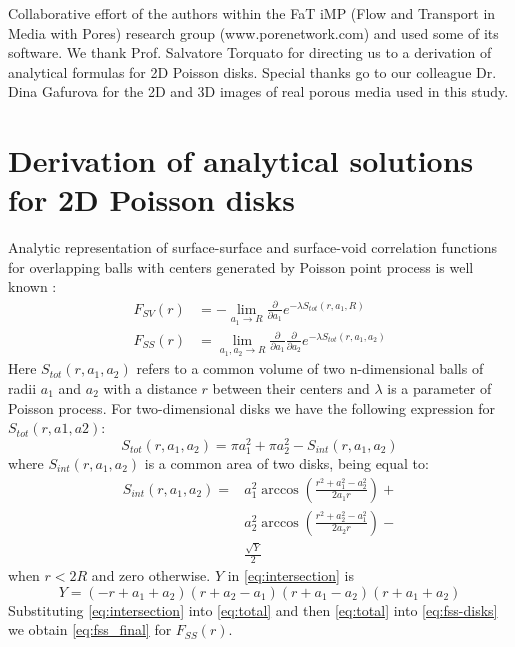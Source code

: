 \documentclass[reprint,amsmath,amssymb,aps,pre,showkeys,showpacs]{revtex4-1}
\begin{document}
Collaborative effort of the authors within the FaT iMP (Flow and Transport in
Media with Pores) research group (www.porenetwork.com) and used some of its
software. We thank Prof. Salvatore Torquato for directing us to a
derivation of analytical formulas for 2D Poisson disks. Special thanks go to
our colleague Dr. Dina Gafurova for the 2D and 3D images of real porous media
used in this study.

\appendix
\section{Derivation of analytical solutions for 2D Poisson disks}
\label{ap:overlapping-disks}
Analytic representation of surface-surface and surface-void correlation
functions for overlapping balls with centers generated by Poisson point process
is well known \cite{Torquato_book}:
\begin{align}
  F_{SV}(r) &= -\lim_{a_1 \rightarrow R} \frac{\partial}{\partial a_1}
  e^{-\lambda S_{tot}(r, a_1, R)} \label{eq:fsv-disks} \\
  F_{SS}(r) &= \lim_{a_1, a_2 \rightarrow R} \frac{\partial}{\partial a_1}
  \frac{\partial}{\partial a_2} e^{-\lambda S_{tot}(r, a_1,
    a_2)} \label{eq:fss-disks}
\end{align}
Here $S_{tot}(r, a_1, a_2)$ refers to a common volume of two n-dimensional balls
of radii $a_1$ and $a_2$ with a distance $r$ between their centers and $\lambda$
is a parameter of Poisson process. For two-dimensional disks we have the
following expression for $S_{tot}(r, a1, a2)$:
\begin{equation}
  S_{tot}(r, a_1, a_2) = \pi a_1^2 + \pi a_2^2 - S_{int}(r, a_1, a_2) \label{eq:total}
\end{equation}
where $S_{int}(r, a_1, a_2)$ is a common area of two disks, being equal to:
\begin{align}
  S_{int}(r, a_1, a_2) =&  a_1^2 \arccos(\frac{r^2+a_1^2-a_2^2}{2a_1r}) + \\
  & a_2^2 \arccos(\frac{r^2+a_2^2-a_1^2}{2a_2r}) - \\
  & \frac{\sqrt{Y}}{2} \label{eq:intersection}
\end{align}
when $r<2R$ and zero otherwise. $Y$ in \cref{eq:intersection} is
\begin{equation*}
  Y = (-r+a_1+a_2)(r+a_2-a_1)(r+a_1-a_2)(r+a_1+a_2)
\end{equation*}
Substituting \cref{eq:intersection} into \cref{eq:total} and then
\cref{eq:total} into \cref{eq:fss-disks} we obtain \cref{eq:fss_final} for
$F_{SS}(r)$.
\end{document}
